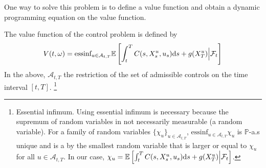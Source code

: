 \documentclass[11pt]{book}
\newcommand{\ds}{\text{\normalfont d}s}
\begin{document}
One way to solve this problem is to define a value function and obtain a dynamic programming equation on the value function.

\begin{defn}
    The value function of the control problem is defined by
\begin{equation}
V(t,\omega)=\textrm{essinf}_{u\in\mathcal{A}_{t,T}}\mathbb{E}\left[\int_{t}^{T}C(s,X_s^u,u_s){{\ds}}+g(X_T^u)\Big|\mathcal{F}_t\right]
\end{equation}
In the above, $\mathcal{A}_{t,T}$ the restriction of the set of admissible controls on the time interval $[t,T]$. \footnote{Essential infimum. Using essential infimum  is necessary because the supremum of random variables in not necessarily measurable (a random variable). For a family of random variables $\{\chi_u\}_{u\in\mathcal{A}_{t,T}}$, $\textrm{essinf}_{u\in\mathcal{A}_{t,T}}\chi_u$ is $\mathbb{P}$-a.s unique and is a by the smallest random variable that is larger or equal to $\chi_u$ for all $u\in\mathcal{A}_{t,T}$. In our case, $\chi_u=\mathbb{E}\left[\int_{t}^{T}C(s,X_s^u,u_s){{\ds}}+g(X_T^u)\Big|\mathcal{F}_t\right]$.}
\end{defn}
\end{document}

